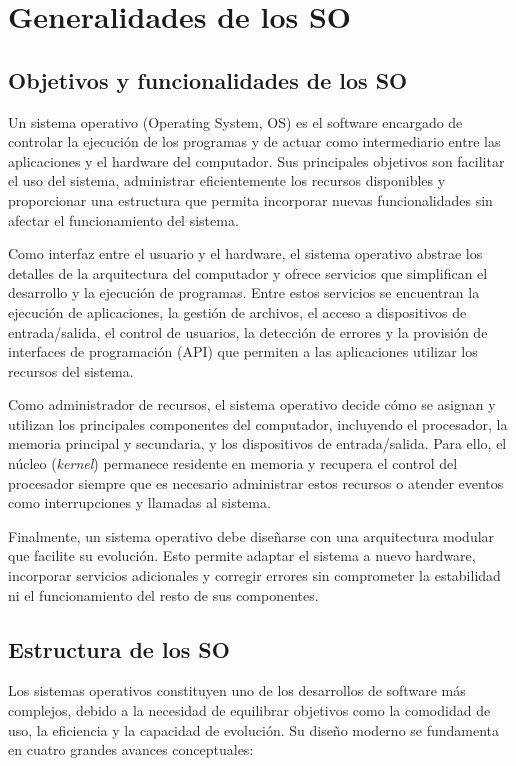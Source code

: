 \section{Generalidades de los SO}

\subsection{Objetivos y funcionalidades de los SO}

Un sistema operativo (Operating System, OS) es el software encargado de controlar la ejecución de los programas y de actuar como intermediario entre las aplicaciones y el hardware del computador. Sus principales objetivos son facilitar el uso del sistema, administrar eficientemente los recursos disponibles y proporcionar una estructura que permita incorporar nuevas funcionalidades sin afectar el funcionamiento del sistema.

Como interfaz entre el usuario y el hardware, el sistema operativo abstrae los detalles de la arquitectura del computador y ofrece servicios que simplifican el desarrollo y la ejecución de programas. Entre estos servicios se encuentran la ejecución de aplicaciones, la gestión de archivos, el acceso a dispositivos de entrada/salida, el control de usuarios, la detección de errores y la provisión de interfaces de programación (API) que permiten a las aplicaciones utilizar los recursos del sistema.

Como administrador de recursos, el sistema operativo decide cómo se asignan y utilizan los principales componentes del computador, incluyendo el procesador, la memoria principal y secundaria, y los dispositivos de entrada/salida. Para ello, el núcleo (\emph{kernel}) permanece residente en memoria y recupera el control del procesador siempre que es necesario administrar estos recursos o atender eventos como interrupciones y llamadas al sistema.

Finalmente, un sistema operativo debe diseñarse con una arquitectura modular que facilite su evolución. Esto permite adaptar el sistema a nuevo hardware, incorporar servicios adicionales y corregir errores sin comprometer la estabilidad ni el funcionamiento del resto de sus componentes.

\subsection{Estructura de los SO}

Los sistemas operativos constituyen uno de los desarrollos de software más complejos, debido a la necesidad de equilibrar objetivos como la comodidad de uso, la eficiencia y la capacidad de evolución. Su diseño moderno se fundamenta en cuatro grandes avances conceptuales:

